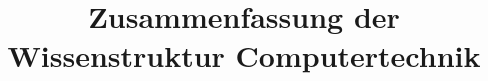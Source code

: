 \documentclass{article}
\title{Zusammenfassung der Wissenstruktur Computertechnik}
\begin{document}
    \maketitle
    \pagebreak
    \tableofcontents
    \pagebreak
    
\end{document}
